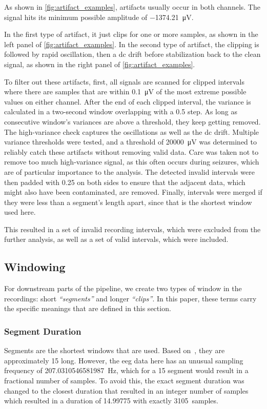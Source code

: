 As shown in \cref{fig:artifact_examples}, artifacts usually occur in both channels.
The signal hits its minimum possible amplitude of \SI{-1374.21}{\micro\volt}.

In the first type of artifact, it just clips for one or more samples, as shown in the left panel of \cref{fig:artifact_examples}.
In the second type of artifact, the clipping is followed by rapid oscillation, then a \gls{dc} drift before stabilization back to the clean signal, as shown in the right panel of \cref{fig:artifact_examples}.

To filter out these artifacts, first, all signals are scanned for clipped intervals where there are samples that are within \SI{0.1}{\micro\volt} of the most extreme possible values on either channel.
After the end of each clipped interval, the variance is calculated in a two-second window overlapping with a \SI{0.5}{\sec} step.
As long as consecutive window's variances are above a threshold, they keep getting removed.
The high-variance check captures the oscillations as well as the \gls{dc} drift.
Multiple variance thresholds were tested, and a threshold of \SI{20000}{\micro\volt} was determined to reliably catch these artifacts without removing valid data.
Care was taken not to remove too much high-variance signal, as this often occurs during seizures, which are of particular importance to the analysis.
The detected invalid intervals were then padded with \SI{0.25}{\sec} on both sides to ensure that the adjacent data, which might also have been contaminated, are removed.
Finally, intervals were merged if they were less than a segment's length apart, since that is the shortest window used here.

This resulted in a set of invalid recording intervals, which were excluded from the further analysis, as well as a set of valid intervals, which were included.

\subsection{Windowing} \label{subsec:windowing}
For downstream parts of the pipeline, we create two types of window in the recordings: short \textit{``segments''} and longer \textit{``clips''}.
In this paper, these terms carry the specific meanings that are defined in this section.

\subsubsection{Segment Duration}
Segments are the shortest windows that are used.
Based on~\textcite{yang_seizure_2024}, they are approximately \SI{15}{\sec} long.
However, the \gls{eeg} data here has an unusual sampling frequency of \SI{207.0310546581987}{\hertz}, which for a \SI{15}{\sec} segment would result in a fractional number of samples.
To avoid this, the exact segment duration was changed to the closest duration that resulted in an integer number of samples which resulted in a duration of \SI{14.99775}{\sec} with exactly \SI{3105}{samples}.

